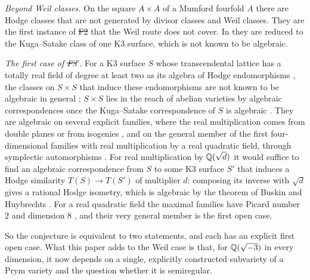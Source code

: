 \emph{Beyond Weil classes.} On the square $A\times A$ of a Mumford fourfold
$A$ \cite{Mum69} there are Hodge classes that are not generated by divisor
classes and Weil classes. They are the first instance of \st{F2} that the
Weil route does not cover. In \cite[Theorem~21.4]{BhH8} they are reduced to
the Kuga--Satake class of one K3 surface, which is not known to be
algebraic.

\emph{The first case of \st{F3$'$}.} For a K3 surface $S$ whose transcendental
lattice has a totally real field of degree at least two as its algebra of
Hodge endomorphisms \cite{vG08}, the classes on $S\times S$ that induce these
endomorphisms are not known to be algebraic in general \cite{BvGS24}; $S\times
S$ lies in the reach of abelian varieties by algebraic correspondences once
the Kuga--Satake correspondence of $S$ is algebraic
\cite[Remark~20.36]{BhH8}. They are algebraic on several explicit families,
where the real multiplication comes from double planes or from isogenies
\cite{Sch10,vGS25}, and on the general member of the first
four-dimensional families with real multiplication by a real quadratic
field, through symplectic automorphisms \cite{Var23}. For real multiplication by $\mathbb{Q}(\sqrt d)$ it would
suffice to find an algebraic correspondence from $S$ to some K3 surface $S'$
that induces a Hodge similarity $T(S)\to T(S')$ of multiplier $d$: composing
its inverse with $\sqrt d$ gives a rational Hodge isometry, which is
algebraic by the theorem of Buskin and Huybrechts \cite{Bus19,Huy19}. For a real quadratic field the
maximal families have Picard number $2$ and dimension $8$ \cite{vG08}, and
their very general member is the first open case.

So the conjecture is equivalent to two statements, and each has an explicit
first open case. What this paper adds to the Weil case is that, for
$\mathbb{Q}(\sqrt{-3})$ in every dimension, it now depends on a single, explicitly
constructed subvariety of a Prym variety and the question whether it is
semiregular.

